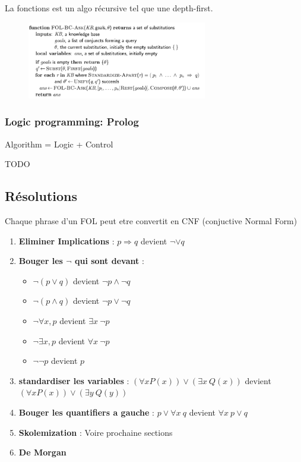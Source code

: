 \documentclass[12pt]{article}
\begin{document}
		La fonctions est un algo récursive tel que une depth-first.
		
		\begin{figure}[htp]	
			\centering
			\includegraphics[width=0.7\textwidth]{img/BackWardChaining.png}
		\end{figure}		
		
		\subsubsection{Logic programming: Prolog}
			Algorithm = Logic + Control
			
			TODO
			
	\subsection{Résolutions}
		Chaque phrase d'un FOL peut etre convertit en CNF (conjuctive Normal Form)
			
		\begin{enumerate}
			\item \textbf{Eliminer Implications} : $p \Rightarrow q$ devient $\neg  \lor q$ 
			\item \textbf{Bouger  les $\neg$ qui sont devant}  :
			\begin{itemize}
				\item $\neg(p\lor q)$ devient $\neg p \land \neg q$
				\item $\neg(p\land q)$ devient $\neg p \lor \neg q$
				\item $\neg \forall x, p$ devient $ \exists x \ \neg p$
				\item $\neg \exists x, p$ devient $\forall x\  \neg p$
				\item $\neg \neg p$ devient $p$
			\end{itemize}
			\item \textbf{standardiser les variables} : $(\forall x P(x)) \lor (\exists x \ Q(x))$ devient $(\forall x P(x)) \lor (\exists y \ Q(y))$
			\item \textbf{Bouger les quantifiers a gauche} : $p \lor \forall x \ q$ devient $\forall x \ p \lor q$
			\item \textbf{Skolemization} : Voire prochaine sections
			\item \textbf{De Morgan}
		\end{enumerate}
		
\end{document}

